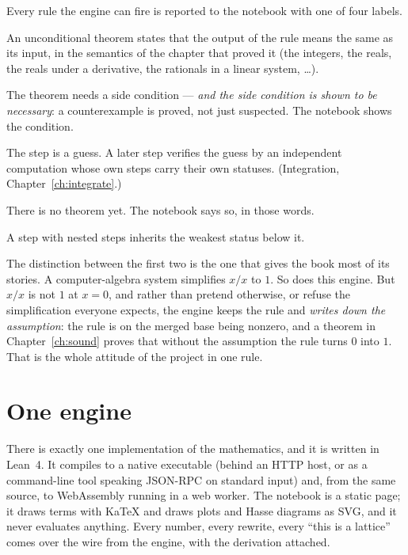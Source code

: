 \begin{defbox}
  Every rule the engine can fire is reported to the notebook with one of four labels.
  \begin{description}[nosep]
    \item[\status{verified}] An unconditional theorem states that the output of the rule means the
      same as its input, in the semantics of the chapter that proved it (the integers, the reals,
      the reals under a derivative, the rationals in a linear system, \dots).
    \item[\status{conditional}] The theorem needs a side condition --- \emph{and the side condition
      is shown to be necessary}: a counterexample is proved, not just suspected. The notebook shows
      the condition.
    \item[\status{checked}] The step is a guess. A later step verifies the guess by an independent
      computation whose own steps carry their own statuses. (Integration, Chapter~\ref{ch:integrate}.)
    \item[\status{unverified}] There is no theorem yet. The notebook says so, in those words.
  \end{description}
  A step with nested steps inherits the weakest status below it.
\end{defbox}

The distinction between the first two is the one that gives the book most of its stories. A
computer-algebra system simplifies $x/x$ to $1$. So does this engine. But $x/x$ is not $1$ at
$x = 0$, and rather than pretend otherwise, or refuse the simplification everyone expects, the
engine keeps the rule and \emph{writes down the assumption}: the rule is  on
the merged base being nonzero, and a theorem in Chapter~\ref{ch:sound} proves that without the
assumption the rule turns $0$ into $1$. That is the whole attitude of the project in one rule.

\section{One engine}

There is exactly one implementation of the mathematics, and it is written in Lean~4. It compiles
to a native executable (behind an HTTP host, or as a command-line tool speaking JSON-RPC on
standard input) and, from the same source, to WebAssembly running in a web worker. The notebook
is a static page; it draws terms with KaTeX and draws plots and Hasse diagrams as SVG, and it never
evaluates anything. Every number, every rewrite, every ``this is a lattice'' comes over the wire
from the engine, with the derivation attached.


